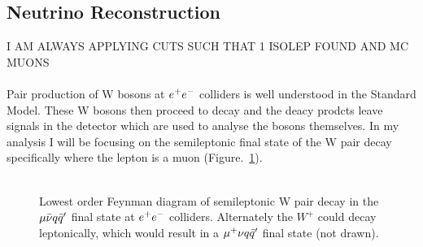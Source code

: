 
\subsection{Neutrino Reconstruction}
\label{neutrino}
I AM ALWAYS APPLYING CUTS SUCH THAT 1 ISOLEP FOUND AND MC MUONS
\\\\
Pair production of W bosons at $e^{+}e^{-}$ colliders is well understood in the Standard Model. These W bosons then proceed to decay and the deacy prodcts leave signals in the detector which are used to analyse the bosons themselves. In my analysis I will be focusing on the semileptonic final state of the W pair decay specifically where the lepton is a muon (Figure.~\ref{FEY:SemileptonicDecays}).
\\\\
\begin{figure}
  \centering
  
  
  \caption{Lowest order Feynman diagram of semileptonic W pair decay in the $\mu\bar{\nu} q\bar{q}'$ final state at $e^{+}e^{-}$ colliders. Alternately the ${W}^{+}$ could decay leptonically, which would result in a $\mu^{+}\nu q\bar{q}'$ final state (not drawn).}
  \label{FEY:SemileptonicDecays}
\end{figure}

